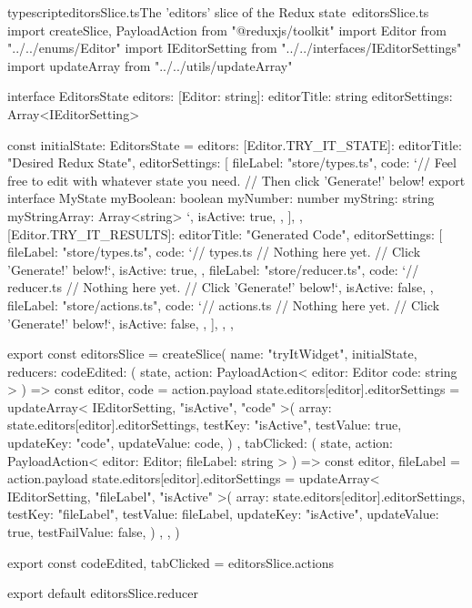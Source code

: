 \documentclass[paper=6in:9in,pagesize=pdftex,headinclude=on,footinclude=on,12pt,twoside]{scrbook}
\begin{document}
\begin{codeInput}{typescript}{editorsSlice.ts}{The 'editors' slice of the Redux state\, editorsSlice.ts}
import { createSlice, PayloadAction } from "@reduxjs/toolkit"
import Editor from "../../enums/Editor"
import IEditorSetting from "../../interfaces/IEditorSettings"
import { updateArray } from "../../utils/updateArray"

interface EditorsState {
  editors: {
    [Editor: string]: {
      editorTitle: string
      editorSettings: Array<IEditorSetting>
    }
  }
}

const initialState: EditorsState = {
  editors: {
    [Editor.TRY_IT_STATE]: {
      editorTitle: "Desired Redux State",
      editorSettings: [
        {
          fileLabel: "store/types.ts",
          code: `// Feel free to edit with whatever state you need.
// Then click 'Generate!' below!
export interface MyState {
  myBoolean: boolean
  myNumber: number
  myString: string
  myStringArray: Array<string>
}`,
          isActive: true,
        },
      ],
    },
    [Editor.TRY_IT_RESULTS]: {
      editorTitle: "Generated Code",
      editorSettings: [
        {
          fileLabel: "store/types.ts",
          code: `// types.ts
// Nothing here yet.
// Click 'Generate!' below!`,
          isActive: true,
        },
        {
          fileLabel: "store/reducer.ts",
          code: `// reducer.ts
// Nothing here yet.
// Click 'Generate!' below!`,
          isActive: false,
        },
        {
          fileLabel: "store/actions.ts",
          code: `// actions.ts
// Nothing here yet.
// Click 'Generate!' below!`,
          isActive: false,
        },
      ],
    },
  },
}

export const editorsSlice = createSlice({
  name: "tryItWidget",
  initialState,
  reducers: {
    codeEdited: (
      state,
      action: PayloadAction<{
        editor: Editor
        code: string
      }>
    ) => {
      const { editor, code } = action.payload
      state.editors[editor].editorSettings = updateArray<
        IEditorSetting,
        "isActive",
        "code"
      >({
        array: state.editors[editor].editorSettings,
        testKey: "isActive",
        testValue: true,
        updateKey: "code",
        updateValue: code,
      })
    },
    tabClicked: (
      state,
      action: PayloadAction<{ editor: Editor; fileLabel: string }>
    ) => {
      const { editor, fileLabel } = action.payload
      state.editors[editor].editorSettings = updateArray<
        IEditorSetting,
        "fileLabel",
        "isActive"
      >({
        array: state.editors[editor].editorSettings,
        testKey: "fileLabel",
        testValue: fileLabel,
        updateKey: "isActive",
        updateValue: true,
        testFailValue: false,
      })
    },
  },
})

export const { codeEdited, tabClicked } = editorsSlice.actions

export default editorsSlice.reducer  
\end{codeInput}
\end{document}
